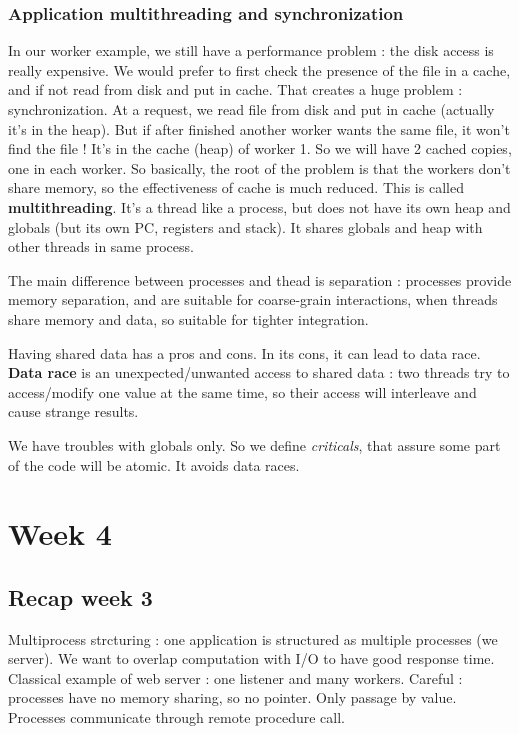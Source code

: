 \documentclass[12pt,a4paper]{article}
\begin{document}
\subsubsection{Application multithreading and synchronization}
In our worker example, we still have a performance problem : the disk access is really expensive. We would prefer to first check the presence of the file in a cache, and if not read from disk and put in cache. That creates a huge problem : synchronization. At a request, we read file from disk and put in cache (actually it's in the heap). But if after finished another worker wants the same file, it won't find the file ! It's in the cache (heap) of worker 1. So we will have 2 cached copies, one in each worker. So basically, the root of the problem is that the workers don't share memory, so the effectiveness of cache is much reduced. This is called \textbf{multithreading}. It's a thread like a process, but does not have its own heap and globals (but its own PC, registers and stack). It shares globals and heap with other threads in same process. 

The main difference between processes and thead is separation : processes provide memory separation, and are suitable for coarse-grain interactions, when threads share memory and data, so suitable for tighter integration.

Having shared data has a pros and cons. In its cons, it can lead to data race. \textbf{Data race} is an unexpected/unwanted access to shared data : two threads try to access/modify one value at the same time, so their access will interleave and cause strange results.

We have troubles with globals only. So we define \textit{criticals}, that assure some part of the code will be atomic. It avoids data races. 


\section{Week 4}
\subsection{Recap week 3}
Multiprocess strcturing : one application is structured as multiple processes (we server). We want to overlap computation with I/O to have good response time. Classical example of web server : one listener and many workers. Careful : processes have no memory sharing, so no pointer. Only passage by value. Processes communicate through remote procedure call. 
\end{document}
